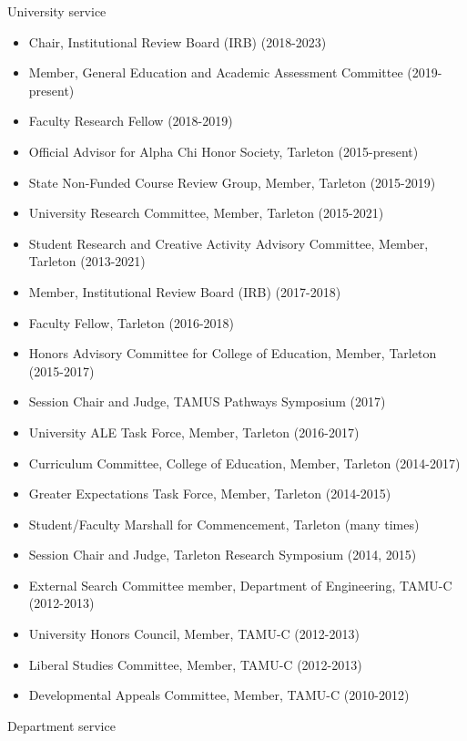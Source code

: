 \documentclass[article,10pt]{article}
\begin{document}
University service

\begin{itemize}
\item Chair, Institutional Review Board (IRB) (2018-2023)
\item Member, General Education and Academic Assessment Committee (2019-present)
\item Faculty Research Fellow (2018-2019)
\item Official Advisor for Alpha Chi Honor Society, Tarleton (2015-present)
\item State Non-Funded Course Review Group, Member, Tarleton (2015-2019)
\item University Research Committee, Member, Tarleton (2015-2021)
\item Student Research and Creative Activity Advisory Committee, Member, Tarleton (2013-2021)
\item Member, Institutional Review Board (IRB) (2017-2018)
\item Faculty Fellow, Tarleton (2016-2018)
\item Honors Advisory Committee for College of Education, Member, Tarleton (2015-2017)
\item Session Chair and Judge, TAMUS Pathways Symposium (2017)
\item University ALE Task Force, Member, Tarleton (2016-2017)
\item Curriculum Committee, College of Education, Member, Tarleton (2014-2017)
\item Greater Expectations Task Force, Member, Tarleton (2014-2015)
\item Student/Faculty Marshall for Commencement, Tarleton (many times)
\item Session Chair and Judge, Tarleton Research Symposium (2014, 2015)
\item External Search Committee member, Department of Engineering, TAMU-C (2012-2013)
\item University Honors Council, Member, TAMU-C (2012-2013)
\item Liberal Studies Committee, Member, TAMU-C (2012-2013)
\item Developmental Appeals Committee, Member, TAMU-C (2010-2012)
\end{itemize}

Department service
\end{document}
